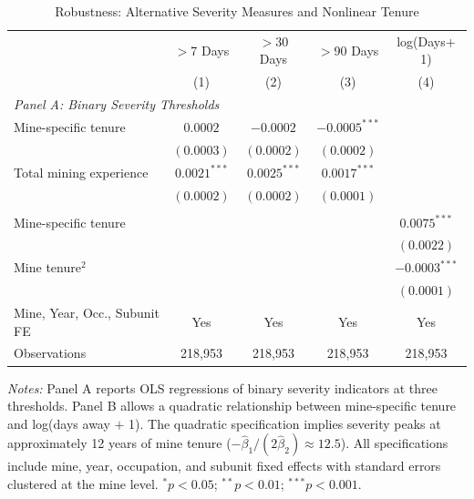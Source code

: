 \begin{table}[t]
\centering
\caption{Robustness: Alternative Severity Measures and Nonlinear Tenure}
\label{tab:robustness}
\begin{tabular}{lcccc}
\toprule
 & $>$7 Days & $>$30 Days & $>$90 Days & log(Days$+$1) \\
 & (1) & (2) & (3) & (4) \\
\midrule
\multicolumn{5}{l}{\textit{Panel A: Binary Severity Thresholds}} \\
Mine-specific tenure & $0.0002$ & $-0.0002$ & $-0.0005^{***}$ & \\
 & $(0.0003)$ & $(0.0002)$ & $(0.0002)$ & \\
\addlinespace
Total mining experience & $0.0021^{***}$ & $0.0025^{***}$ & $0.0017^{***}$ & \\
 & $(0.0002)$ & $(0.0002)$ & $(0.0001)$ & \\
\addlinespace
\multicolumn{5}{l}{\textit{Panel B: Quadratic Tenure}} \\
Mine-specific tenure & & & & $0.0075^{***}$ \\
 & & & & $(0.0022)$ \\
\addlinespace
Mine tenure$^2$ & & & & $-0.0003^{***}$ \\
 & & & & $(0.0001)$ \\
\midrule
Mine, Year, Occ., Subunit FE & Yes & Yes & Yes & Yes \\
Observations & 218,953 & 218,953 & 218,953 & 218,953 \\
\bottomrule
\end{tabular}
\begin{tablenotes}[flushleft]
\item \textit{Notes:} Panel A reports OLS regressions of binary severity indicators at three thresholds. Panel B allows a quadratic relationship between mine-specific tenure and log(days away $+$ 1). The quadratic specification implies severity peaks at approximately 12 years of mine tenure ($-\hat{\beta}_1 / (2\hat{\beta}_2) \approx 12.5$). All specifications include mine, year, occupation, and subunit fixed effects with standard errors clustered at the mine level. $^{*}p<0.05$; $^{**}p<0.01$; $^{***}p<0.001$.
\end{tablenotes}
\end{table}

